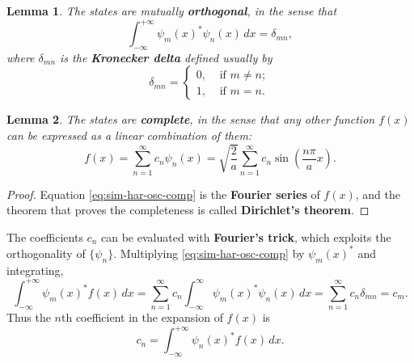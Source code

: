 \documentclass{article}
\newtheorem*{lemma*}{Lemma}
\begin{document}
\begin{lemma*}
  The states are mutually \textbf{orthogonal}, in the sense that
  \begin{equation} \label{eq:sim-har-osc-ort}
    \int_{-\infty}^{+\infty} \psi_m(x)^* \psi_n(x) \,dx = \delta_{mn},
  \end{equation}
  where $\delta_{mn}$ is the \textbf{Kronecker delta} defined usually by
  \begin{equation} \label{eq:kro-del}
    \delta_{mn} =
    \begin{cases}
      0, &\text{ if } m \neq n; \\
      1, &\text{ if } m = n.
    \end{cases}
  \end{equation}
\end{lemma*}

\begin{lemma*}
  The states are \textbf{complete}, in the sense that any \emph{other} function
  $f(x)$ can be expressed as a linear combination of them:
  \begin{equation} \label{eq:sim-har-osc-comp}
    f(x)
    = \sum_{n = 1}^{\infty} c_n\psi_n(x)
    = \sqrt{\frac{2}{a}} \sum_{n = 1}^{\infty}
      c_n\sin\left(\frac{n\pi}{a}x\right).
  \end{equation}
\end{lemma*}
\begin{proof}
  Equation \eqref{eq:sim-har-osc-comp} is the \textbf{Fourier series} of
  $f(x)$, and the theorem that proves the completeness is called
  \textbf{Dirichlet's theorem}.
\end{proof}

The coefficients $c_n$ can be evaluated with \textbf{Fourier's trick}, which
exploits the orthogonality of $\{\psi_n\}$. Multiplying
\eqref{eq:sim-har-osc-comp} by $\psi_m(x)^*$ and integrating,
\begin{equation} \label{eq:sim-har-osc-psi-coeff-1}
  \int_{-\infty}^{+\infty} \psi_m(x)^* f(x) \,dx
  = \sum_{n = 1}^{\infty} c_n \int_{-\infty}^{\infty}
    \psi_m(x)^* \psi_n(x)
  \,dx
  = \sum_{n = 1}^{\infty} c_n\delta_{mn}
  = c_m.
\end{equation}
Thus the $n$th coefficient in the expansion of $f(x)$ is
\begin{equation} \label{eq:sim-har-osc-psi-coeff}
  \boxed{
    c_n = \int_{-\infty}^{+\infty} \psi_n(x)^* f(x) \,dx.
  }
\end{equation}
\end{document}
